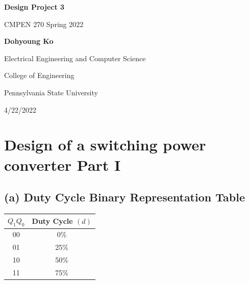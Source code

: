 \documentclass{article}
\begin{document}
\begin{titlepage}
    \begin{center}
        \vspace*{1cm}
            
        \Huge
        \textbf{Design Project 3}
            
        \vspace{0.5cm}
        \LARGE
        CMPEN 270 Spring 2022
            
        \vspace{1.5cm}
            
        \textbf{Dohyoung Ko}
            
        \vspace{3cm}

        \Large
        Electrical Engineering and Computer Science \\

        \vspace{0.2cm}

        \Large
        College of Engineering \\
        
        \vspace{0.2cm}

        Pennsylvania State University\\
        
        \vspace{0.4cm}

        4/22/2022
            
    \end{center}
\end{titlepage}

\section*{Design of a switching power converter Part I}

\subsection*{(a) Duty Cycle Binary Representation Table}

\begin{table}[!ht]
    \centering
    \begin{tabular}{|c|c|}
    \hline
    $Q_1 Q_0$ & Duty Cycle $(d)$ \\ \hline
    00   & 0\%            \\ \hline
    01   & 25\%           \\ \hline
    10   & 50\%           \\ \hline
    11   & 75\%           \\ \hline
    \end{tabular}
\end{table}
\end{document}
